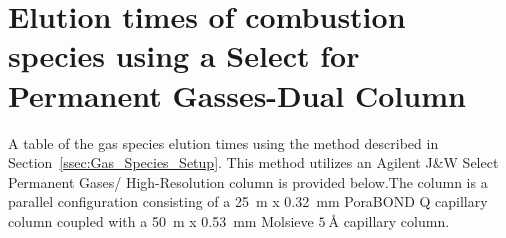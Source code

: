 \documentclass[12pt]{article}
\begin{document}
\pagebreak

\section{Elution times of combustion species using a Select for Permanent Gasses-Dual Column}\label{sec:Elution Times}

A table of the gas species elution times using the method described in Section~\ref{ssec:Gas_Species_Setup}. This method utilizes an Agilent J\&W Select Permanent Gases/ High-Resolution column is provided below.The column is a parallel configuration consisting of a 25~m x 0.32~mm PoraBOND Q capillary column coupled with a 50~m x 0.53~mm Molsieve $\SI{5}{\angstrom}$ capillary column. 

\begin{table}[h!]


\end{table}
\end{document}
